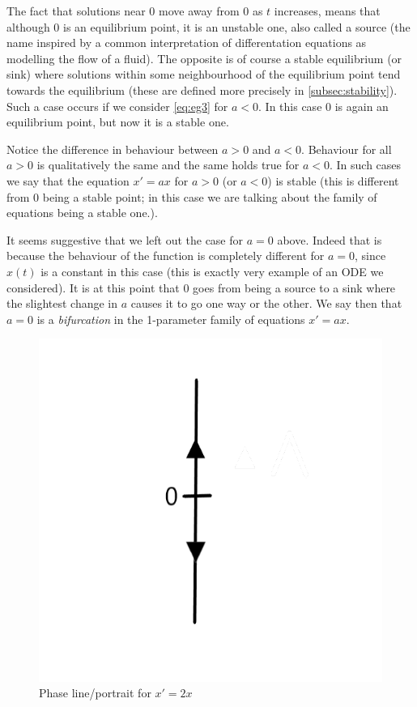 The fact that solutions near 0 move away from 0 as $t$ increases, means that although 0 is an equilibrium point, it is an unstable one, also called a source (the name inspired by a common interpretation of differentation equations as modelling the flow of a fluid). The opposite is of course a stable equilibrium (or sink) where solutions within some neighbourhood of the equilibrium point tend towards the equilibrium (these are defined more precisely in \autoref{subsec:stability}). Such a case occurs if we consider \autoref{eq:eg3} for $a < 0$. In this case 0 is again an equilibrium point, but now it is a stable one.

Notice the difference in behaviour between $a > 0$ and $a < 0$. Behaviour for all $a > 0$ is qualitatively the same and the same holds true for $a < 0$. In such cases we say that the equation $x' = ax$ for $a > 0$ (or $a < 0$) is stable (this is different from 0 being a stable point; in this case we are talking about the family of equations being a stable one.). 

It seems suggestive that we left out the case for $a = 0$ above. Indeed that is because the behaviour of the function is completely different for $a = 0$, since $x(t)$ is a constant in this case (this is exactly very example of an ODE we considered). It is at this point that 0 goes from being a source to a sink where the slightest change in $a$ causes it to go one way or the other. We say then that $a = 0$ is a \textit{bifurcation} in the 1-parameter family of equations $x' = ax$.

\begin{figure}[ht]
    \centering
    \includegraphics[scale=0.25]{Images/phase_line.png}
    \caption{Phase line/portrait for $x' = 2x$}
    \label{fig:phase_line}
\end{figure}

